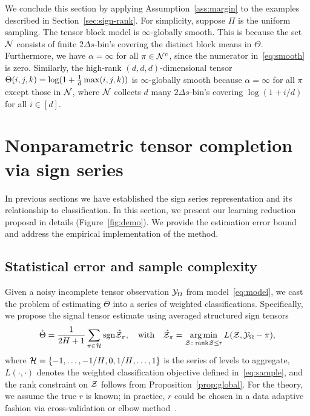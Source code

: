 \documentclass{article}
\theoremstyle{plain}
\theoremstyle{definition}
\def\sign{\textup{sgn}}
\begin{document}
We conclude this section by applying Assumption~\ref{ass:margin} to the examples described in Section~\ref{sec:sign-rank}. For simplicity, suppose $\Pi$ is the uniform sampling. 
The tensor block model is $\infty$-globally smooth. This is because the set $\mathcal{N}$ consists of finite $2\Delta s$-bin's covering the distinct block means in $\Theta$. Furthermore, we have $\alpha= \infty$ for all $\pi \in \mathcal{N}^c$, since the numerator in~\eqref{eq:smooth} is zero. Similarly, the high-rank $(d,d,d)$-dimensional tensor $\Theta(i,j,k) = \log(1+{1\over d}\max(i,j,k))$ is $\infty$-globally smooth because $\alpha=\infty$ for all $\pi$ except those in $\mathcal{N}$, where $\mathcal{N}$ collects $d$ many $2\Delta s$-bin's covering $\log(1+i/d)$ for all $i \in[d]$.


\section{Nonparametric tensor completion via sign series}\label{sec:estimation}

In previous sections we have established the sign series representation and its relationship to classification. In this section, we present our learning reduction proposal in details (Figure~\ref{fig:demo}). We provide the estimation error bound and address the empirical implementation of the method. 


\subsection{Statistical error and sample complexity}\label{sec:error}
Given a noisy incomplete tensor observation $\mathcal{Y}_\Omega$ from model~\eqref{eq:model}, we cast the problem of estimating $\Theta$ into a series of weighted classifications. Specifically, we propose the signal tensor estimate using averaged structured sign tensors
\begin{equation}\label{eq:est}
\hat \Theta = {1\over 2H+1}\sum_{\pi \in \tH}\sign{\hat \tZ_\pi}, \quad \text{with}\quad \hat \tZ_\pi = \argmin_{\tZ\colon \text{rank}\tZ\leq r} L(\tZ, \tY_\Omega-\pi),
\end{equation}
where $\mathcal{H}=\{-1,\ldots,-{1/ H}, 0, {1/H},\ldots,1\}$ is the series of levels to aggregate, $L(\cdot,\cdot)$ denotes the weighted classification objective defined in~\eqref{eq:sample}, and the rank constraint on $\mathcal{Z}$ follows from Proposition~\ref{prop:global}. For the theory, we assume the true $r$ is known; in practice, $r$ could be chosen in a data adaptive fashion via cross-validation or elbow method~\citep{hastie2009elements}. 
\end{document}
